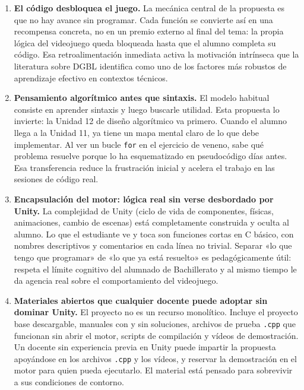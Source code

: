\documentclass[a4paper,12pt]{article}
\begin{document}
\begin{enumerate}

  \item \textbf{El código desbloquea el juego.}
  La mecánica central de la propuesta es que no hay avance sin programar. Cada función se convierte así en una recompensa concreta, no en un premio externo al final del tema: la propia lógica del videojuego queda bloqueada hasta que el alumno completa su código. Esa retroalimentación inmediata activa la motivación intrínseca que la literatura sobre DGBL identifica como uno de los factores más robustos de aprendizaje efectivo en contextos técnicos.

  \item \textbf{Pensamiento algorítmico antes que sintaxis.}
  El modelo habitual consiste en aprender sintaxis y luego buscarle utilidad. Esta propuesta lo invierte: la Unidad 12 de diseño algorítmico va primero. Cuando el alumno llega a la Unidad 11, ya tiene un mapa mental claro de lo que debe implementar. Al ver un bucle \texttt{for} en el ejercicio de veneno, sabe qué problema resuelve porque lo ha esquematizado en pseudocódigo días antes. Esa transferencia reduce la frustración inicial y acelera el trabajo en las sesiones de código real.

  \item \textbf{Encapsulación del motor: lógica real sin verse desbordado por Unity.}
  La complejidad de Unity (ciclo de vida de componentes, físicas, animaciones, cambio de escenas) está completamente construida y oculta al alumno. Lo que el estudiante ve y toca son funciones cortas en C básico, con nombres descriptivos y comentarios en cada línea no trivial. Separar «lo que tengo que programar» de «lo que ya está resuelto» es pedagógicamente útil: respeta el límite cognitivo del alumnado de Bachillerato y al mismo tiempo le da agencia real sobre el comportamiento del videojuego.

  \item \textbf{Materiales abiertos que cualquier docente puede adoptar sin dominar Unity.}
  El proyecto no es un recurso monolítico. Incluye el proyecto base descargable, manuales con y sin soluciones, archivos de prueba \texttt{.cpp} que funcionan sin abrir el motor, scripts de compilación y vídeos de demostración. Un docente sin experiencia previa en Unity puede impartir la propuesta apoyándose en los archivos \texttt{.cpp} y los vídeos, y reservar la demostración en el motor para quien pueda ejecutarlo. El material está pensado para sobrevivir a sus condiciones de contorno.


\end{enumerate}
\end{document}
